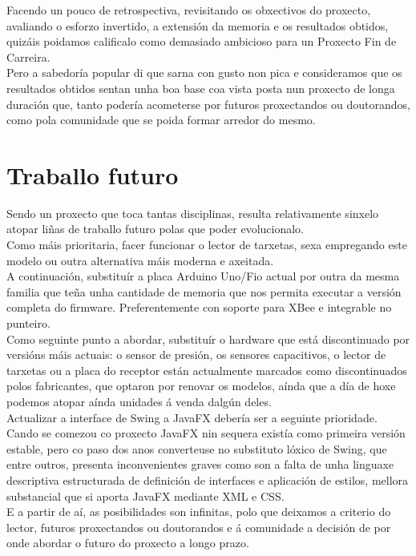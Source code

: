  Facendo un pouco de retrospectiva, revisitando os obxectivos do proxecto,
 avaliando o esforzo invertido, a extensión da memoria e os resultados obtidos,
 quizáis poidamos calificalo como demasiado ambicioso para un Proxecto Fin de
 Carreira. \\
 
 Pero a sabedoría popular di que sarna con gusto non pica e consideramos que os
 resultados obtidos sentan unha boa base coa vista posta nun proxecto de longa
 duración que, tanto podería acometerse por futuros proxectandos ou doutorandos,
 como pola comunidade que se poida formar arredor do mesmo. \\
 
 \section{Traballo futuro}
 
 Sendo un proxecto que toca tantas disciplinas, resulta relativamente sinxelo
 atopar liñas de traballo futuro polas que poder evolucionalo. \\
 
 Como máis prioritaria, facer funcionar o lector de tarxetas, sexa empregando
 este modelo ou outra alternativa máis moderna e axeitada. \\
 
 A continuación, substituír a placa Arduino Uno/Fio actual por outra da
 mesma familia que teña unha cantidade de memoria que nos permita executar a
 versión completa do firmware. Preferentemente con soporte para XBee e
 integrable no punteiro. \\
 
 Como seguinte punto a abordar, substituír o hardware que está discontinuado por
 versións máis actuais: o sensor de presión, os sensores capacitivos, o lector
 de tarxetas ou a placa do receptor están actualmente marcados como
 discontinuados polos fabricantes, que optaron por renovar os modelos, aínda que
 a día de hoxe podemos atopar aínda unidades á venda dalgún deles. \\
 
 Actualizar a interface de Swing a JavaFX debería ser a seguinte prioridade.
 Cando se comezou co proxecto JavaFX nin sequera existía como primeira versión
 estable, pero co paso dos anos converteuse no substituto lóxico de Swing, que
 entre outros, presenta inconvenientes graves como son a falta de unha linguaxe
 descriptiva estructurada de definición de interfaces e aplicación de estilos,
 mellora substancial que si aporta JavaFX mediante XML e CSS. \\
 
 E a partir de aí, as posibilidades son infinitas, polo que deixamos a criterio
 do lector, futuros proxectandos ou doutorandos e á comunidade a decisión de por
 onde abordar o futuro do proxecto a longo prazo. \\
 
 
